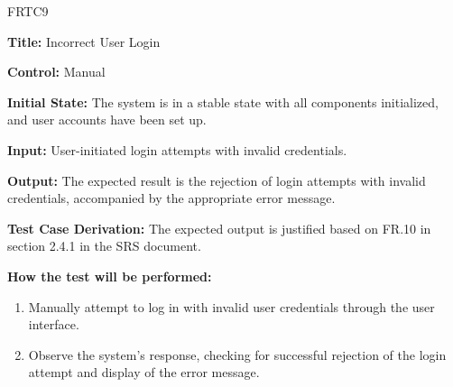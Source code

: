 \documentclass[12pt, titlepage]{article}
\begin{document}
\begin{itemize}
    \begin{item}
        FRTC9
        \begin{mdframed}[linewidth=0.5mm]
            \textbf{Title:} Incorrect User Login \par
            \textbf{Control:} Manual \par
            \textbf{Initial State:} The system is in a stable state with all components initialized, and user accounts have been set up. \par
            \textbf{Input:} User-initiated login attempts with invalid credentials. \par
            \textbf{Output:} The expected result is the rejection of login attempts with invalid credentials, accompanied by the appropriate error message. \par
            \textbf{Test Case Derivation:} The expected output is justified based on FR.10 in section 2.4.1 in the SRS document. \par
            \textbf{How the test will be performed:}
            \begin{enumerate}[noitemsep]
                \item Manually attempt to log in with invalid user credentials through the user interface.
                \item Observe the system's response, checking for successful rejection of the login attempt and display of the error message.
            \end{enumerate}
        \end{mdframed}
    \end{item}


\end{itemize}
\end{document}
